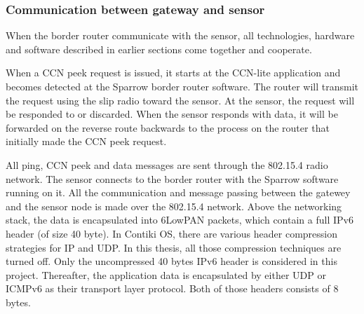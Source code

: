 \subsubsection{Communication between gateway and sensor}

When the border router communicate with the sensor, all technologies, hardware and software described in earlier sections come together and cooperate.

When a CCN peek request is issued, it starts at the CCN-lite application and becomes detected at the Sparrow border router software. The router will transmit the request using the slip radio toward the sensor. At the sensor, the request will be responded to or discarded. When the sensor responds with data, it will be forwarded on the reverse route backwards to the process on the router that initially made the CCN peek request.

All ping, CCN peek and data messages are sent through the 802.15.4 radio network. The sensor connects to the border router with the Sparrow software running on it. All the communication and message passing between the gatewey and the sensor node is made over the 802.15.4 network. Above the networking stack, the data is encapsulated into 6LowPAN packets, which contain a full IPv6 header (of size 40 byte). In Contiki OS, there are various header compression strategies for IP and UDP. In this thesis, all those compression techniques are turned off. Only the uncompressed 40 bytes IPv6 header is considered in this project. Thereafter, the application data is encapsulated by either UDP or ICMPv6 as their transport layer protocol. Both of those headers consists of 8 bytes. 


 




